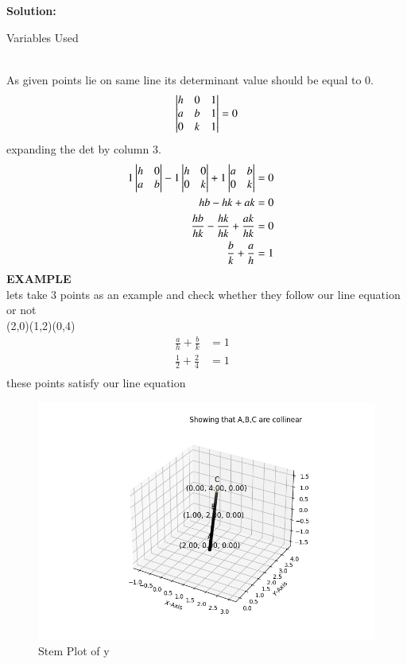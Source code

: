 \documentclass[journal]{IEEEtran}
\begin{document}
\textbf{Solution: }
\begin{table}[h!]    
  \centering
  
  \caption{Variables Used}
  \label{tab10.5.3.9.1}
\end{table}\\
As given points lie on same line its determinant value should be equal to 0.
\begin{align}
 \begin{vmatrix}h & 0 & 1 \\ a & b & 1 \\ 0 & k & 1\end{vmatrix} = 0 \label{1.6.9.1}
\end{align}
expanding the det by column 3.
\begin{align}
 1\begin{vmatrix}h & 0 \\ a & b\end{vmatrix} - 1\begin{vmatrix} h & 0 \\ 0 & k \end{vmatrix} + 1\begin{vmatrix} a & b \\ 0 & k \end{vmatrix} &= 0& \\
 hb - hk + ak &= 0& \\
 \frac{hb}{hk} - \frac{hk}{hk} + \frac{ak}{hk} &= 0& \\
 \frac{b}{k} + \frac{a}{h} &= 1& \\
\end{align}
\textbf{EXAMPLE}\\
lets take 3 points as an example and check whether they follow our line equation or not \\
(2,0)(1,2)(0,4)
\begin{align}
 \frac{a}{h} + \frac{b}{k} &= 1& \\
 \frac{1}{2} + \frac{2}{4}  &= 1&  \\
\end{align}
these points satisfy our line equation
\begin{figure}[h!]
   \centering
   \includegraphics[width=0.7\linewidth]{figs/fig2.png}
   \caption{Stem Plot of y}
   \label{stemplot}
\end{figure}
\end{document}
